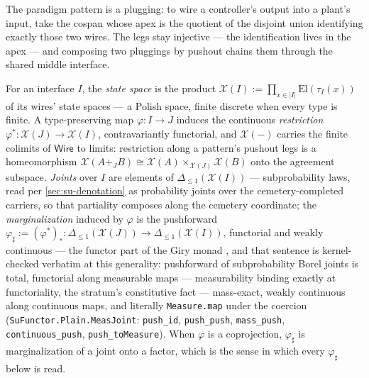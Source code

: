The paradigm pattern is a plugging: to wire a controller's output
into a plant's input, take the cospan whose apex is the quotient of
the disjoint union identifying exactly those two wires. The legs
stay injective --- the identification lives in the apex --- and
composing two pluggings by pushout chains them through the shared
middle interface.

\begin{definition}
\label{def:su-state-spaces}
For an interface $I$, the \emph{state space} is the product
$\mathcal{X}(I) := \prod_{x \in |I|} \mathrm{El}(\tau_I(x))$ of its
wires' state spaces --- a Polish space, finite discrete when every
type is finite. A type-preserving map $\varphi \colon I \to J$
induces the continuous \emph{restriction}
$\varphi^{*} \colon \mathcal{X}(J) \to \mathcal{X}(I)$,
contravariantly functorial, and $\mathcal{X}(-)$ carries the finite
colimits of $\mathsf{Wire}$ to limits: restriction along a
pattern's pushout legs is a homeomorphism
$\mathcal{X}(A +_J B) \cong \mathcal{X}(A)
\times_{\mathcal{X}(J)} \mathcal{X}(B)$ onto the agreement
subspace. \emph{Joints} over $I$ are elements of
$\Delta_{\le 1}(\mathcal{X}(I))$ --- subprobability laws, read per
\autoref{sec:su-denotation} as probability joints over the
cemetery-completed carriers, so that
partiality composes along the cemetery coordinate; the
\emph{marginalization} induced by $\varphi$ is the pushforward
$\varphi_{\sharp} := (\varphi^{*})_{*} \colon
\Delta_{\le 1}(\mathcal{X}(J)) \to \Delta_{\le 1}(\mathcal{X}(I))$,
functorial and
weakly continuous --- the functor part of the Giry monad
\cite{giry82}, and that sentence is kernel-checked verbatim at this
generality: pushforward of subprobability Borel joints is total,
functorial along measurable maps --- measurability binding exactly
at functoriality, the stratum's constitutive fact ---
mass-exact, weakly continuous along continuous maps, and literally
\texttt{Measure.map} under the coercion
(\texttt{SuFunctor.Plain.MeasJoint}: \texttt{push\_id},
\texttt{push\_push}, \texttt{mass\_push},
\texttt{continuous\_push}, \texttt{push\_toMeasure}).
When $\varphi$ is a coprojection,
$\varphi_{\sharp}$ is marginalization of a joint onto a factor,
which is the sense in which every $\varphi_{\sharp}$ below is read.
\end{definition}

